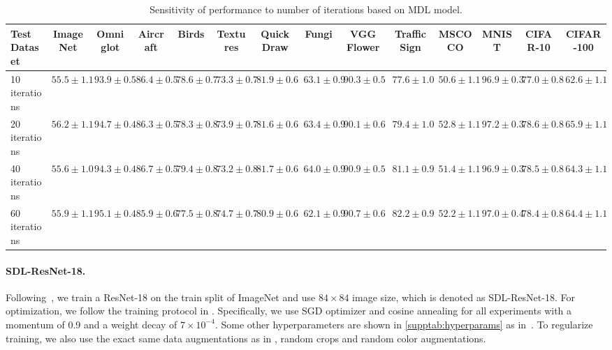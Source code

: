 \begin{table*}[t]
	\centering
    \resizebox{1.0\textwidth}{!}
    {
		\begin{tabular}{lcccccccc|ccccc}

		    \toprule
		    Test Dataset & ImageNet & Omniglot & Aircraft & Birds & Textures & Quick Draw & Fungi & VGG Flower & Traffic Sign & MSCOCO & MNIST & CIFAR-10 & CIFAR-100\\
		    \midrule
		    10 iterations & $55.5 \pm 1.1$ & $93.9 \pm 0.5$ & $86.4 \pm 0.5$ & $78.6 \pm 0.7$ & $73.3 \pm 0.7$ & $81.9 \pm 0.6$ & $63.1 \pm 0.9$ & $90.3 \pm 0.5$ & $77.6 \pm 1.0$ & $50.6 \pm 1.1$ & $96.9 \pm 0.3$ & $77.0 \pm 0.8$ & $62.6 \pm 1.1$ \\
		    20 iterations & $56.2 \pm 1.1$ & $94.7 \pm 0.4$ & $86.3 \pm 0.5$ & $78.3 \pm 0.8$ & $73.9 \pm 0.7$ & $81.6 \pm 0.6$ & $63.4 \pm 0.9$ & $90.1 \pm 0.6$ & $79.4 \pm 1.0$ & $52.8 \pm 1.1$ & $97.2 \pm 0.3$ & $78.6 \pm 0.8$ & $65.9 \pm 1.1$ \\
		    40 iterations & $55.6 \pm 1.0$ & $94.3 \pm 0.4$ & $86.7 \pm 0.5$ & $79.4 \pm 0.8$ & $73.2 \pm 0.8$ & $81.7 \pm 0.6$ & $64.0 \pm 0.9$ & $90.9 \pm 0.5$ & $81.1 \pm 0.9$ & $51.4 \pm 1.1$ & $96.9 \pm 0.3$ & $78.5 \pm 0.8$ & $64.3 \pm 1.1$ \\
		    60 iterations & $55.9 \pm 1.1$ & $95.1 \pm 0.4$ & $85.9 \pm 0.6$ & $77.5 \pm 0.8$ & $74.7 \pm 0.7$ & $80.9 \pm 0.6$ & $62.1 \pm 0.9$ & $90.7 \pm 0.6$ & $82.2 \pm 0.9$ & $52.2 \pm 1.1$ & $97.0 \pm 0.4$ & $78.4 \pm 0.8$ & $64.4 \pm 1.1$ \\
			\bottomrule
		\end{tabular}%
			}
		\vspace{-0.25cm}
		\caption{Sensitivity of performance to number of iterations based on MDL model.}
		\label{supptab:mtliterations}
\end{table*}%


\paragraph{SDL-ResNet-18.}
Following~\cite{triantafillou2019meta,dvornik2020selecting,li2021universal}, we train a ResNet-18 on the train split of ImageNet and use $84\times 84$ image size, which is denoted as SDL-ResNet-18.
For optimization, we follow the training protocol in \cite{dvornik2020selecting,li2021universal}. Specifically, we use SGD optimizer and cosine annealing for all experiments with a momentum of 0.9 and a weight decay of $7\times 10^{-4}$. 
Some other hyperparameters are shown in \cref{supptab:hyperparams} as in~\cite{dvornik2020selecting,li2021universal}. To regularize training, we also use the exact same data augmentations as in \cite{dvornik2020selecting,li2021universal}, \eg random crops and random color augmentations. 

